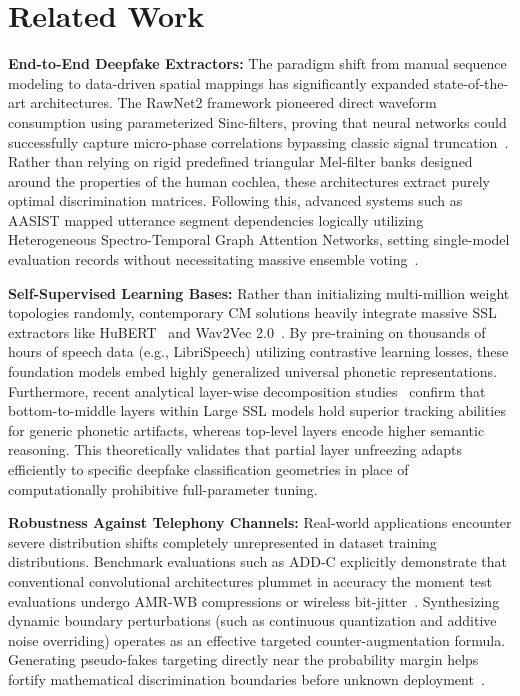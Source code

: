 \documentclass[10pt, twocolumn]{article}
\begin{document}
\section{Related Work}

\textbf{End-to-End Deepfake Extractors:} The paradigm shift from manual sequence modeling to data-driven spatial mappings has significantly expanded state-of-the-art architectures. The RawNet2 framework pioneered direct waveform consumption using parameterized Sinc-filters, proving that neural networks could successfully capture micro-phase correlations bypassing classic signal truncation~\cite{rawnet2}. Rather than relying on rigid predefined triangular Mel-filter banks designed around the properties of the human cochlea, these architectures extract purely optimal discrimination matrices. Following this, advanced systems such as AASIST mapped utterance segment dependencies logically utilizing Heterogeneous Spectro-Temporal Graph Attention Networks, setting single-model evaluation records without necessitating massive ensemble voting~\cite{aasist}.

\textbf{Self-Supervised Learning Bases:} Rather than initializing multi-million weight topologies randomly, contemporary CM solutions heavily integrate massive SSL extractors like HuBERT~\cite{hubert_add} and Wav2Vec 2.0~\cite{wav2vec2}. By pre-training on thousands of hours of speech data (e.g., LibriSpeech) utilizing contrastive learning losses, these foundation models embed highly generalized universal phonetic representations. Furthermore, recent analytical layer-wise decomposition studies~\cite{ssl_layerwise} confirm that bottom-to-middle layers within Large SSL models hold superior tracking abilities for generic phonetic artifacts, whereas top-level layers encode higher semantic reasoning. This theoretically validates that partial layer unfreezing adapts efficiently to specific deepfake classification geometries in place of computationally prohibitive full-parameter tuning.

\textbf{Robustness Against Telephony Channels:} Real-world applications encounter severe distribution shifts completely unrepresented in dataset training distributions. Benchmark evaluations such as ADD-C explicitly demonstrate that conventional convolutional architectures plummet in accuracy the moment test evaluations undergo AMR-WB compressions or wireless bit-jitter~\cite{addc_benchmark}. Synthesizing dynamic boundary perturbations (such as continuous quantization and additive noise overriding) operates as an effective targeted counter-augmentation formula. Generating pseudo-fakes targeting directly near the probability margin helps fortify mathematical discrimination boundaries before unknown deployment~\cite{targeted_aug}.
\end{document}
